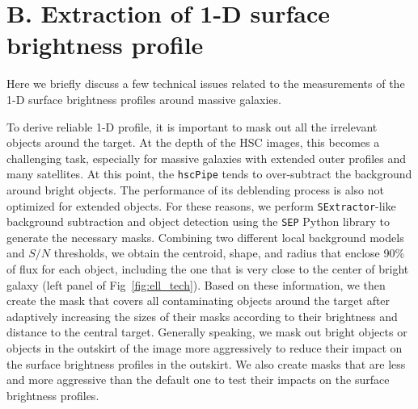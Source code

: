 \documentclass[a4paper,fleqn,usenatbib]{mnras}
\begin{document}
\section{B. Extraction of 1-D surface brightness profile} 
    \label{app:ellipse} 
    
    Here we briefly discuss a few technical issues related to the measurements of the 
    1-D surface brightness profiles around massive galaxies. 
    
    To derive reliable 1-D profile, it is important to mask out all the irrelevant 
    objects around the target.
    At the depth of the HSC images, this becomes a challenging task, especially 
    for massive galaxies with extended outer profiles and many satellites. 
    At this point, the \texttt{hscPipe} tends to over-subtract the background around 
    bright objects.  
    The performance of its deblending process is also not optimized for extended
    objects. 
    For these reasons, we perform \texttt{SExtractor}-like background subtraction and 
    object detection using the \texttt{SEP} Python library to generate the necessary 
    masks.
    Combining two different local background models and $S/N$ thresholds, we obtain 
    the centroid, shape, and radius that enclose 90\% of flux for each object, 
    including the one that is very close to the center of bright galaxy (left panel of 
    Fig~\ref{fig:ell_tech}). 
    Based on these information, we then create the mask that covers all contaminating 
    objects around the target after adaptively increasing the sizes of their masks 
    according to their brightness and distance to the central target. 
    Generally speaking, we mask out bright objects or objects in the outskirt of the 
    image more aggressively to reduce their impact on the surface brightness profiles 
    in the outskirt. 
    We also create masks that are less and more aggressive than the default one to 
    test their impacts on the surface brightness profiles. 
    
\end{document}
